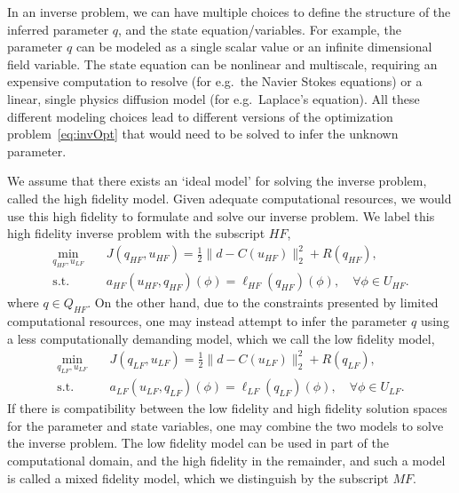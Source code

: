 In an inverse problem, we can have multiple choices to define the structure of the inferred parameter $q$, and the state equation/variables. For example, the parameter $q$ can be modeled as a single scalar value or an infinite dimensional field variable. The state equation can be nonlinear and multiscale, requiring an expensive computation to resolve (for e.g.\ the Navier Stokes equations) or a linear, single physics diffusion model (for e.g.\ Laplace's equation). All these different modeling choices lead to different versions of the optimization problem~\ref{eq:invOpt} that would need to be solved to infer the unknown parameter.

We assume that there exists an `ideal model' for solving the inverse problem, called the high fidelity model. Given adequate computational resources, we would use this high fidelity to formulate and solve our inverse problem. We label this high fidelity inverse problem with the subscript $HF$,
%
\begin{subequations}
\label{eq:invOptHF}
\begin{align}
\min\limits_{q_{HF},u_{LF}} & \quad J(q_{HF},u_{HF})=\frac{1}{2}\|d-C(u_{HF})\|_2^2 + R(q_{HF}), \label{eq:invOpt_objHF} \\
\textrm{s.t. }& \quad a_{HF}(u_{HF},q_{HF})(\phi)=\ell_{HF}(q_{HF})(\phi),\quad\forall\phi\in U_{HF}. \label{eq:invOpt_consHF}
\end{align}
\end{subequations}
%
where $q \in Q_{HF}$. On the other hand, due to the constraints presented by limited computational resources, one may instead attempt to infer the parameter $q$ using a less computationally demanding model, which we call the low fidelity model,
%
\begin{subequations}
\label{eq:invOptLF}
\begin{align}
\min\limits_{q_{LF},u_{LF}} & \quad J(q_{LF},u_{LF})=\frac{1}{2}\|d-C(u_{LF})\|_2^2 + R(q_{LF}), \label{eq:invOpt_objLF} \\
\textrm{s.t. }& \quad a_{LF}(u_{LF},q_{LF})(\phi)=\ell_{LF}(q_{LF})(\phi),\quad\forall\phi\in U_{LF}. \label{eq:invOpt_consLF}
\end{align}
\end{subequations}
%
If there is compatibility between the low fidelity and high fidelity solution spaces for the parameter and state variables, one may combine the two models to solve the inverse problem. The low fidelity model can be used in part of the computational domain, and the high fidelity in the remainder, and such a model is called a mixed fidelity model, which we distinguish by the subscript $MF$.

